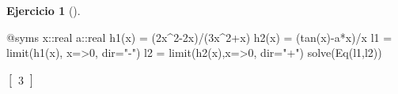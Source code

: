 \documentclass[
  a4paper,
]{scrreport}
\newenvironment{Shaded}{\begin{snugshade}}{\end{snugshade}}
\newcommand{\DataTypeTok}[1]{\textcolor[rgb]{0.68,0.00,0.00}{#1}}
\newcommand{\FloatTok}[1]{\textcolor[rgb]{0.68,0.00,0.00}{#1}}
\newcommand{\FunctionTok}[1]{\textcolor[rgb]{0.28,0.35,0.67}{#1}}
\newcommand{\NormalTok}[1]{\textcolor[rgb]{0.00,0.23,0.31}{#1}}
\newcommand{\OperatorTok}[1]{\textcolor[rgb]{0.37,0.37,0.37}{#1}}
\newcommand{\PreprocessorTok}[1]{\textcolor[rgb]{0.68,0.00,0.00}{#1}}
\newcommand{\StringTok}[1]{\textcolor[rgb]{0.13,0.47,0.30}{#1}}
\theoremstyle{definition}
\newtheorem{exercise}{Ejercicio}[chapter]
\theoremstyle{remark}
\begin{document}
\begin{exercise}[]
\begin{tcolorbox}
\begin{Shaded}
\begin{Highlighting}[]
\PreprocessorTok{@syms}\NormalTok{ x}\OperatorTok{::}\DataTypeTok{real }\NormalTok{a}\OperatorTok{::}\DataTypeTok{real}
\FunctionTok{h1}\NormalTok{(x) }\OperatorTok{=}\NormalTok{ (}\FloatTok{2}\NormalTok{x}\OperatorTok{\^{}}\FloatTok{2}\OperatorTok{{-}}\FloatTok{2}\NormalTok{x)}\OperatorTok{/}\NormalTok{(}\FloatTok{3}\NormalTok{x}\OperatorTok{\^{}}\FloatTok{2}\OperatorTok{+}\NormalTok{x)}
\FunctionTok{h2}\NormalTok{(x) }\OperatorTok{=}\NormalTok{ (}\FunctionTok{tan}\NormalTok{(x)}\OperatorTok{{-}}\NormalTok{a}\OperatorTok{*}\NormalTok{x)}\OperatorTok{/}\NormalTok{x }
\NormalTok{l1 }\OperatorTok{=} \FunctionTok{limit}\NormalTok{(}\FunctionTok{h1}\NormalTok{(x), x}\OperatorTok{=\textgreater{}}\FloatTok{0}\NormalTok{, dir}\OperatorTok{=}\StringTok{"{-}"}\NormalTok{)}
\NormalTok{l2 }\OperatorTok{=} \FunctionTok{limit}\NormalTok{(}\FunctionTok{h2}\NormalTok{(x),x}\OperatorTok{=\textgreater{}}\FloatTok{0}\NormalTok{, dir}\OperatorTok{=}\StringTok{"+"}\NormalTok{)}
\FunctionTok{solve}\NormalTok{(}\FunctionTok{Eq}\NormalTok{(l1,l2))}
\end{Highlighting}
\end{Shaded}

$\left[\begin{smallmatrix}3\end{smallmatrix}\right]$

\end{tcolorbox}

\end{exercise}
\end{document}
